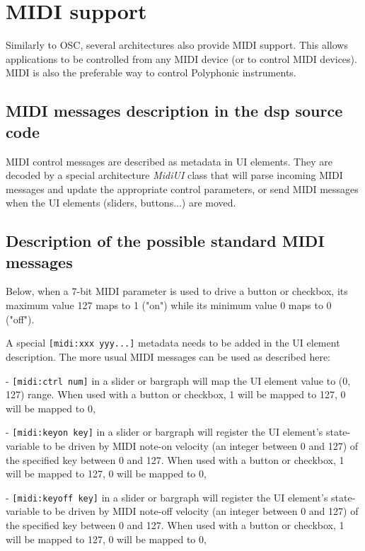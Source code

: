 \chapter{MIDI support} \label{sec:midi}

Similarly to OSC, several \faust architectures also provide MIDI support. This allows \faust applications to be controlled from any MIDI device (or to control MIDI devices). MIDI is also the preferable way to control Polyphonic instruments.

\section{MIDI messages description in the dsp source code}

MIDI control messages are described as metadata in UI elements. They are decoded by a special architecture \emph{MidiUI} class that will parse incoming MIDI messages and update the appropriate control parameters, or send MIDI messages when the UI elements (sliders, buttons...) are moved.

\section{Description of the possible standard MIDI messages}

Below, when a 7-bit MIDI parameter is used to drive a button or
checkbox, its maximum value 127 maps to 1 ("on") while its minimum
value 0 maps to 0 ("off").

A special \lstinline'[midi:xxx yyy...]' metadata needs to be added in the UI  element description. The more usual MIDI messages can be used as described here:

- \lstinline'[midi:ctrl num]' in a slider or bargraph will map the UI element value to (0, 127) range. When used with a button or checkbox, 1 will be mapped to 127, 0 will be mapped to 0,

- \lstinline'[midi:keyon key]' in a slider or bargraph will
register the UI element's state-variable to be driven by MIDI note-on
velocity (an integer between 0 and 127) of the specified key
between 0 and 127. When used with a button or checkbox, 1 will be mapped to 127, 0 will be mapped to 0,

- \lstinline'[midi:keyoff key]' in a slider or bargraph will
register the UI element's state-variable to be driven by MIDI note-off
velocity (an integer between 0 and 127) of the specified key
between 0 and 127. When used with a button or checkbox, 1 will be mapped to 127, 0 will be mapped to 0,

